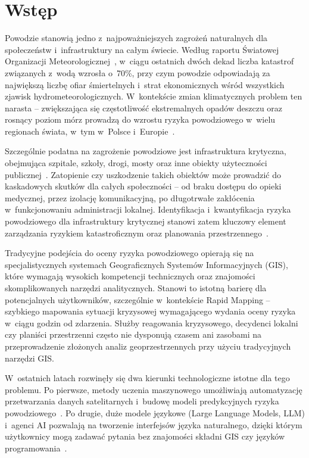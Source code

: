 \section*{Wstęp}
\label{chap:Wstęp}

Powodzie stanowią jedno z~najpoważniejszych zagrożeń naturalnych dla społeczeństw i~infrastruktury na całym świecie. Według raportu Światowej Organizacji Meteorologicznej~\cite{wmo2021}, w~ciągu ostatnich dwóch dekad liczba katastrof związanych z~wodą wzrosła o~70\%, przy czym powodzie odpowiadają za największą liczbę ofiar śmiertelnych i~strat ekonomicznych wśród wszystkich zjawisk hydrometeorologicznych. W~kontekście zmian klimatycznych problem ten narasta -- zwiększająca się częstotliwość ekstremalnych opadów deszczu oraz rosnący poziom mórz prowadzą do wzrostu ryzyka powodziowego w~wielu regionach świata, w~tym w~Polsce i~Europie~\cite{undrr2022}.

Szczególnie podatna na zagrożenie powodziowe jest infrastruktura krytyczna, obejmująca szpitale, szkoły, drogi, mosty oraz inne obiekty użyteczności publicznej~\cite{koks2019}. Zatopienie czy uszkodzenie takich obiektów może prowadzić do kaskadowych skutków dla całych społeczności -- od braku dostępu do opieki medycznej, przez izolację komunikacyjną, po długotrwałe zakłócenia w~funkcjonowaniu administracji lokalnej. Identyfikacja i~kwantyfikacja ryzyka powodziowego dla infrastruktury krytycznej stanowi zatem kluczowy element zarządzania ryzykiem katastroficznym oraz planowania przestrzennego~\cite{chukwuma2021flood}.

Tradycyjne podejścia do oceny ryzyka powodziowego opierają się na specjalistycznych systemach Geograficznych Systemów Informacyjnych (GIS), które wymagają wysokich kompetencji technicznych oraz znajomości skomplikowanych narzędzi analitycznych. Stanowi to istotną barierę dla potencjalnych użytkowników, szczególnie w~kontekście Rapid Mapping -- szybkiego mapowania sytuacji kryzysowej wymagającego wydania oceny ryzyka w~ciągu godzin od zdarzenia. Służby reagowania kryzysowego, decydenci lokalni czy planiści przestrzenni często nie dysponują czasem ani zasobami na przeprowadzenie złożonych analiz geoprzestrzennych przy użyciu tradycyjnych narzędzi GIS.

W~ostatnich latach rozwinęły się dwa kierunki technologiczne istotne dla tego problemu. Po pierwsze, metody uczenia maszynowego umożliwiają automatyzację przetwarzania danych satelitarnych i~budowę modeli predykcyjnych ryzyka powodziowego~\cite{waleed2025advancing}. Po drugie, duże modele językowe (Large Language Models, LLM) i~agenci AI pozwalają na tworzenie interfejsów języka naturalnego, dzięki którym użytkownicy mogą zadawać pytania bez znajomości składni GIS czy języków programowania~\cite{li2024chatgeoai}.

